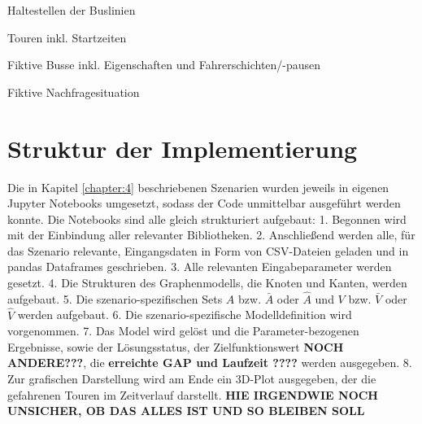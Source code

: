 \begin{table}[htbp]
    \centering
    \begin{minipage}{0.5\textwidth}
      \centering
      \caption{Haltestellen der Buslinien}\label{tab:buslines}
    \end{minipage}\hfill
    \begin{minipage}{0.5\textwidth}
      \centering
      \caption{Touren inkl. Startzeiten}\label{tab:lines}
    \end{minipage}
\end{table}
\begin{table}
    \centering
    \caption{Fiktive Busse inkl. Eigenschaften und Fahrerschichten/-pausen}\label{tab:busses}
\end{table}  
\newpage
\begin{table}
      \centering
      \caption{Fiktive Nachfragesituation}\label{tab:demand}
\end{table}
    

\section{Struktur der Implementierung}
Die in  Kapitel \ref{chapter:4} beschriebenen Szenarien wurden jeweils in eigenen Jupyter Notebooks umgesetzt, sodass der Code unmittelbar ausgeführt werden konnte. Die Notebooks sind alle gleich strukturiert aufgebaut: 1. Begonnen wird mit der Einbindung aller relevanter Bibliotheken. 2. Anschließend werden alle, für das Szenario relevante, Eingangsdaten in Form von CSV-Dateien geladen und in pandas Dataframes geschrieben. 3. Alle relevanten Eingabeparameter werden gesetzt. 4. Die Strukturen des Graphenmodells, die Knoten und Kanten, werden aufgebaut. 5. Die szenario-spezifischen Sets $A$ bzw. $\bar{A}$ oder $\hat{A} $ und $V$ bzw. $\bar{V}$ oder $\hat{V}$ werden aufgebaut. 6. Die szenario-spezifische Modelldefinition wird vorgenommen. 7. Das Model wird gelöst und die Parameter-bezogenen Ergebnisse, sowie der Lösungsstatus, der Zielfunktionswert \textbf{NOCH ANDERE???}, die \textbf{erreichte GAP und Laufzeit ????} werden ausgegeben. 8. Zur grafischen Darstellung wird am Ende ein 3D-Plot ausgegeben, der die gefahrenen Touren im Zeitverlauf darstellt. \textbf{HIE IRGENDWIE NOCH UNSICHER, OB DAS ALLES IST UND SO BLEIBEN SOLL}

